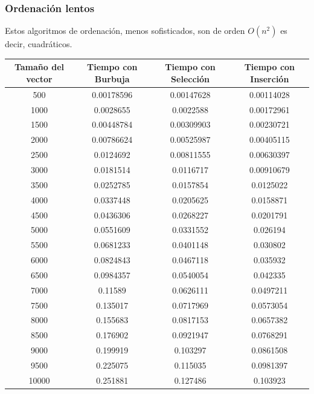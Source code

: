 \documentclass{article}
\begin{document}
	\subsubsection{Ordenación lentos}
		Estos algoritmos de ordenación, menos sofisticados, son de orden $O(n ^2)$ es decir, cuadráticos.
		\begin{longtable}{|c|c|c|c|}
			\hline
			Tamaño del vector & Tiempo con Burbuja & Tiempo con Selección & Tiempo con Inserción \\ \hline
			500	   &    0.00178596	&  0.00147628  	   &  0.00114028   \\ \hline
			1000  &	    0.0028655	&  0.0022588  	   &  0.00172961   \\ \hline
			1500  &	    0.00448784	&  0.00309903  	   &  0.00230721   \\ \hline
			2000  &	    0.00786624	&  0.00525987  	   &  0.00405115   \\ \hline
			2500  &	    0.0124692	&  0.00811555  	   &  0.00630397   \\ \hline
			3000  &	    0.0181514	&  0.0116717  	   &  0.00910679   \\ \hline
			3500  &	    0.0252785	&  0.0157854  	   &  0.0125022   \\ \hline
			4000  &	    0.0337448	&  0.0205625  	   &  0.0158871   \\ \hline
			4500  &	    0.0436306	&  0.0268227  	   &  0.0201791   \\ \hline
			5000  &	    0.0551609	&  0.0331552  	   &  0.026194   \\ \hline
			5500  &	    0.0681233	&  0.0401148  	   &  0.030802   \\ \hline
			6000  &	    0.0824843	&  0.0467118  	   &  0.035932   \\ \hline
			6500  &	    0.0984357	&  0.0540054   	   &  0.042335   \\ \hline
			7000  &	    0.11589	    &  0.0626111   	   &  0.0497211   \\ \hline
			7500  &	    0.135017	&  0.0717969   	   &  0.0573054   \\ \hline
			8000  &	    0.155683	&  0.0817153   	   &  0.0657382   \\ \hline
			8500  &	    0.176902	&  0.0921947   	   &  0.0768291   \\ \hline
			9000  &	    0.199919	&  0.103297	       &  0.0861508   \\ \hline
			9500  &	    0.225075	&  0.115035	       &  0.0981397   \\ \hline
			10000  &	0.251881	&  0.127486	       &  0.103923   \\ \hline

\end{longtable}
\end{document}
